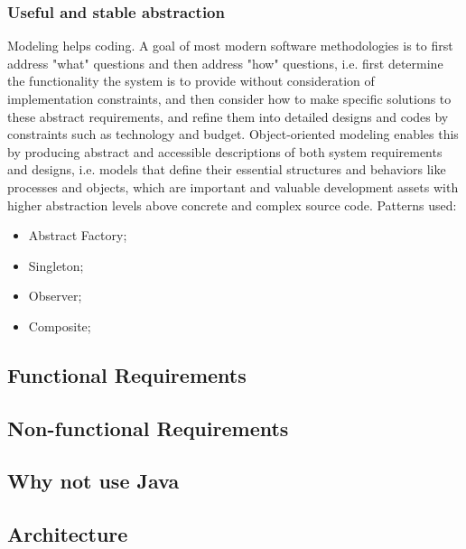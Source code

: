 \documentclass{acm_proc_article-sp}
\begin{document}
\subsubsection{Useful and stable abstraction}

Modeling helps coding. A goal of most modern software methodologies is to first address "what" questions and then address "how" questions, i.e. first determine the functionality the system is to provide without consideration of implementation constraints, and then consider how to make specific solutions to these abstract requirements, and refine them into detailed designs and codes by constraints such as technology and budget. Object-oriented modeling enables this by producing abstract and accessible descriptions of both system requirements and designs, i.e. models that define their essential structures and behaviors like processes and objects, which are important and valuable development assets with higher abstraction levels above concrete and complex source code.
\newline
\newline
Patterns used:
\begin{itemize}
\item Abstract Factory;
\item Singleton;
\item Observer;
\item Composite;
\end{itemize}

\subsection{Functional Requirements}
 
\subsection{Non-functional Requirements}

\subsection{Why not use Java}

\subsection{Architecture}
\end{document}
